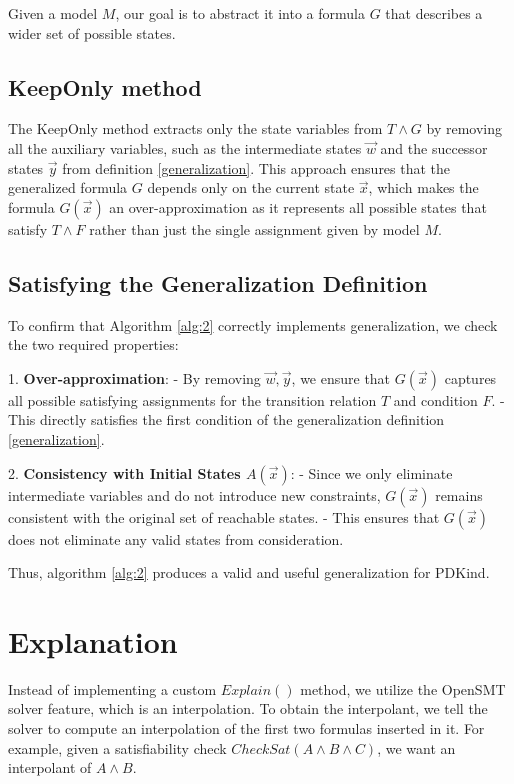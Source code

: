 Given a model $M$, our goal is to abstract it into a formula $G$ that describes a wider set of possible states.

\subsection*{KeepOnly method}
The KeepOnly method extracts only the state variables from $T \land G$ by removing all the auxiliary variables, such as the intermediate states $\vec{w}$ and the successor states $\vec{y}$ from definition \ref{generalization}. This approach ensures that the generalized formula $G$ depends only on the current state $\vec{x}$, which makes the formula $G(\vec{x})$ an over-approximation as it represents all possible states that satisfy $T \land F$ rather than just the single assignment given by model $M$.

\subsection*{Satisfying the Generalization Definition}
To confirm that Algorithm \ref{alg:2} correctly implements generalization, we check the two required properties:


1. \textbf{Over-approximation}:
- By removing $\vec{w}, \vec{y}$, we ensure that $G(\vec{x})$ captures all possible satisfying assignments for the transition relation $T$ and condition $F$.
- This directly satisfies the first condition of the generalization definition \ref{generalization}.

2. \textbf{Consistency with Initial States $A(\vec{x})$}:
- Since we only eliminate intermediate variables and do not introduce new constraints, $G(\vec{x})$ remains consistent with the original set of reachable states.
- This ensures that $G(\vec{x})$ does not eliminate any valid states from consideration.

Thus, algorithm \ref{alg:2} produces a valid and useful generalization for PDKind.

\section*{Explanation} \label{Explain}
\noindent Instead of implementing a custom \( Explain() \) method, we utilize the OpenSMT solver feature, which is an interpolation. To obtain the interpolant, we tell the solver to compute an interpolation of the first two formulas inserted in it. For example, given a satisfiability check $CheckSat(A \land B \land C)$, we want an interpolant of $A \land B$.

